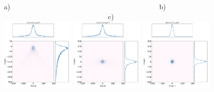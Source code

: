 \documentclass{iucr}              %
\begin{document}
\begin{figure}[h]
\flushleft
a)~~~~~~~~~~~~~~~~~~~~~~~~~~~~~~~~~~~~~~~~~~~b)~~~~~~~~~~~~~~~~~~~~~~~~~~~~~~~~~~~~~~~~~~~c)\\
\centering
\includegraphics[width=0.32\textwidth]{figures/als_toroid.png}
\includegraphics[width=0.32\textwidth]{figures/als_parabolic-cone.png}
\includegraphics[width=0.32\textwidth]{figures/als_diaboloid.png}


\end{figure}
\end{document}
